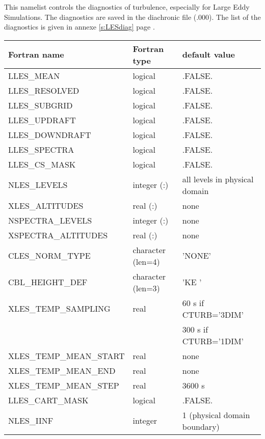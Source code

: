 This namelist controls the diagnostics of turbulence, especially
for Large Eddy Simulations. The diagnostics are saved in the
diachronic file (.000). The list of the diagnostics is given in annexe \ref{s:LESdiag} page  \pageref{s:LESdiag}.

\begin{longtable} {|p{}|p{}|p{}|}
\hline
Fortran name &  Fortran type & default value \\
\hline 
\endhead
\hline
\endfoot
LLES\_MEAN                    &  logical          & .FALSE.  \\
LLES\_RESOLVED                &  logical          & .FALSE.  \\
LLES\_SUBGRID                 &  logical          & .FALSE.  \\
LLES\_UPDRAFT                 &  logical          & .FALSE.  \\
LLES\_DOWNDRAFT               &  logical          & .FALSE.  \\
LLES\_SPECTRA                 &  logical          & .FALSE.  \\
LLES\_CS\_MASK                &  logical          & .FALSE.  \\
NLES\_LEVELS                  & integer (:)       & all levels in physical domain\\
XLES\_ALTITUDES               & real (:)          & none \\
NSPECTRA\_LEVELS              & integer (:)   & none \\
XSPECTRA\_ALTITUDES           & real (:)   & none \\
CLES\_NORM\_TYPE              & character (len=4) & 'NONE' \\
CBL\_HEIGHT\_DEF              & character (len=3) & 'KE ' \\
XLES\_TEMP\_SAMPLING          & real              & 60 s if CTURB='3DIM' \\
                              &                   & 300 s if CTURB='1DIM' \\
XLES\_TEMP\_MEAN\_START       & real              & none \\
XLES\_TEMP\_MEAN\_END         & real              & none \\
XLES\_TEMP\_MEAN\_STEP        & real              & 3600 s \\
LLES\_CART\_MASK              & logical           & .FALSE. \\
NLES\_IINF                    & integer           & 1 (physical domain boundary) \\

\end{longtable}
